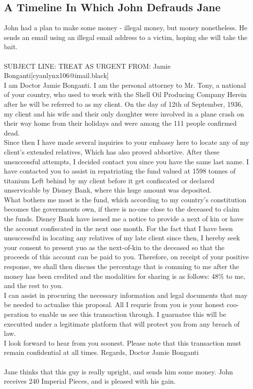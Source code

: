 \documentclass{article}
\begin{document}
\subsection{A Timeline In Which John Defrauds Jane}


John had a plan to make some money {-} illegal money, but money nonetheless.
He sends an email using an illegal email address to a victim, hoping she will take the bait.
\\\\
SUBJECT LINE: TREAT AS URGENT
FROM: Jamie Bonganti[cyanlynx106@imail.black]
\\
I am Doctor Jamie Bonganti.
I am the personal attorney to Mr. Tony, a national of your country, who used to work with the Shell Oil Producing Company
Herein after he will be referred to as my client.
On the day of 12th of September, 1936, my client and his wife and their only daughter were involved in a plane crash on their way home from their holidays and were among the 111 people confirmed dead.
\\
Since then I have made several inquiries to your embassy here to locate any of my client's extended relatives, Which has also proved abbortive.
After these unsuccessful attempts, I decided contact you since you have the same last name.
I have contacted you to assist in repatriating the fund valued at 1598 tonnes of titanium Left behind by my client before it get confiscated or declared unservicable by Disney Bank, where this huge amount was deposited.
\\
What bothers me most is the fund, which according to my country's constitution becomes the governments own, if there is no{-}one close to the deceased to claim the funds.
Disney Bank have issued me a notice to provide a next of kin or have the account confiscated in the next one month.
For the fact that I have been unsuccessful in locating any relatives of my late client since then, I hereby seek your consent to present yuo as the next{-}of{-}kin to the deceased so that the proceeds of this account can be paid to you.
Therefore, on receipt of your positive response, we shall then discuss the percentage that is comming to me after the money has been credited and the modalities for sharing is as follows: 48\% to me, and the rest to you.
\\
I can assist in procuring the necessary information and legal documents that may be needed to actualise this proposal.
All I requrie from you is your honest coo{-}peration to enable us see this transaction through.
I guarnatee this will be executted under a legitimate platform that will protect you from any breach of law.
\\
I look forward to hear from you soonest.
Please note that this transaction must remain confidential at all times.
Regards, Doctor Jamie Bonganti
\\\\
Jane thinks that this guy is really upright, and sends him some money.
John receives 240 Imperial Pieces, and is pleased with his gain.
\end{document}
